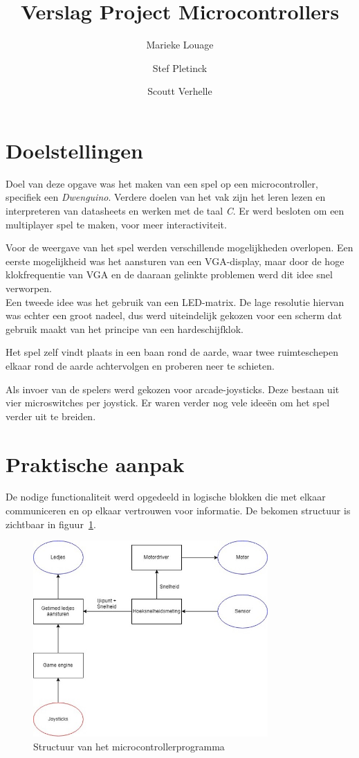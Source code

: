 \documentclass[12pt]{ugentreport}
\title{Verslag Project Microcontrollers}
\author{Marieke Louage\and Stef Pletinck\and Scoutt Verhelle}
\begin{document}
\maketitle

\tableofcontents
\listoffigures
\listoftodos
\newpage

\section{Doelstellingen}
Doel van deze opgave was het maken van een spel op een microcontroller,
specifiek een \emph{Dwenguino}.
Verdere doelen van het vak zijn het leren lezen en interpreteren van datasheets
en werken met de taal \emph{C}.
Er werd besloten om een multiplayer spel te maken,
voor meer interactiviteit.

Voor de weergave van het spel werden verschillende mogelijkheden overlopen.
Een eerste mogelijkheid was het aansturen van een VGA-display,
maar door de hoge klokfrequentie van VGA en de daaraan gelinkte problemen
werd dit idee snel verworpen.\\
Een tweede idee was het gebruik van een LED-matrix.
De lage resolutie hiervan was echter een groot nadeel,
dus werd uiteindelijk gekozen voor een scherm dat gebruik maakt
van het principe van een hardeschijfklok.

Het spel zelf vindt plaats in een baan rond de aarde, waar twee ruimteschepen
elkaar rond de aarde achtervolgen en proberen neer te schieten.

Als invoer van de spelers werd gekozen voor arcade-joysticks.
Deze bestaan uit vier microswitches per joystick.
Er waren verder nog vele ideeën om het spel verder uit te breiden.

\section{Praktische aanpak}
De nodige functionaliteit werd opgedeeld in logische blokken die met elkaar
communiceren en op elkaar vertrouwen voor informatie. De bekomen structuur is
zichtbaar in figuur~\ref{fig:structuur}.

\begin{figure}
  \centering
  \includegraphics[width=0.8\textwidth]{img/structuur.jpg}
  \caption{Structuur van het microcontrollerprogramma}
  \label{fig:structuur}
\end{figure}
\end{document}
